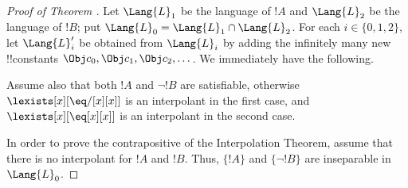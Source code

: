 \documentclass[../../include/open-logic-section]{subfiles}
\begin{document}



\begin{proof}[Proof of Theorem ]
Let $\Lang{L}_1$ be the language of $!A$ and $\Lang{L}_2$ be the
language of $!B$; put $\Lang{L}_0 = \Lang{L}_1 \cap \Lang{L}_2$. For
each $i \in \{0, 1, 2 \}$, let $\Lang{L}'_i$ be obtained from
$\Lang{L}_i$ by adding the infinitely many new !!{constant}s $\Obj c_0,
\Obj c_1, \Obj c_2, \dots$. We immediately have the following.

Assume also that both $!A$ and $\lnot !B$ are satisfiable, otherwise
$\lexists[x][\eq/[x][x]]$ is an interpolant in the first case, and
$\lexists[x][\eq[x][x]]$ is an interpolant in the second case.

In order to prove the contrapositive of the Interpolation Theorem, assume
that there is no interpolant for $!A$ and $!B$. Thus, $\{ !A \}$ and
$\{\lnot!B\}$ are inseparable in $\Lang{L}_0$.


\end{proof}
\end{document}
